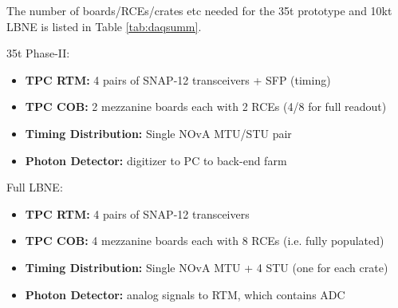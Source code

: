 The number of boards/RCEs/crates etc needed for the 35t prototype and 10kt LBNE is listed in Table \ref{tab:daqsumm}.  

35t Phase-II:  
\begin{itemize}
\item  \textbf{TPC RTM: }  4 pairs of SNAP-12 transceivers + SFP (timing)
\item  \textbf{TPC COB:  }  2 mezzanine boards each with 2 RCEs (4/8 for full readout)
\item  \textbf{Timing Distribution:  }    Single NOvA MTU/STU pair
 \item  \textbf{Photon Detector:  }    digitizer to PC to back-end farm 
\end{itemize}


Full LBNE:
\begin{itemize}
\item  \textbf{TPC RTM: }  4 pairs of SNAP-12 transceivers 
\item  \textbf{TPC COB:  }  4 mezzanine boards each with 8 RCEs (i.e. fully populated)
\item  \textbf{Timing Distribution:  }    Single NOvA MTU + 4 STU (one for each crate)
 \item  \textbf{Photon Detector:  }    analog signals to RTM, which contains ADC
\end{itemize}



